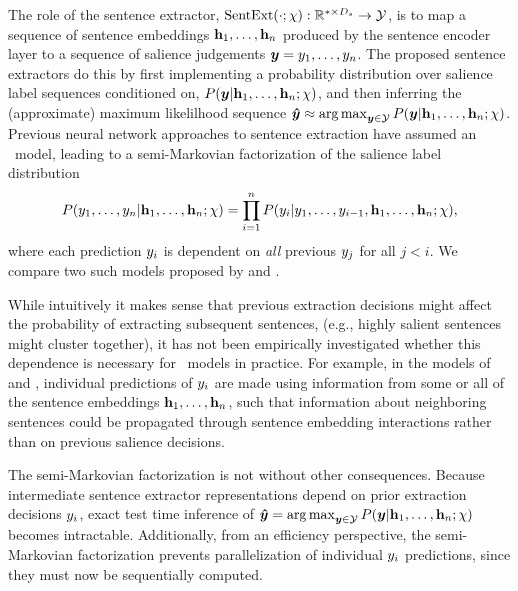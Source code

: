 The role of the sentence extractor, 
$\operatorname{SentExt}(\cdot; \chi) : \mathbb{R}^{* \times D_{s}} \rightarrow \mathcal{Y}$, is to map a
sequence of sentence 
embeddings 
    $\mathbf{h}_1,\ldots,\mathbf{h}_n$ %
produced by the sentence encoder layer to a sequence of salience judgements 
    $\boldsymbol{y} = y_1,\ldots, y_n$. %
    The proposed sentence extractors do this by first implementing a 
    probability distribution over salience label sequences conditioned 
    on, $P(\boldsymbol{y}|\mathbf{h}_1,\ldots,\mathbf{h}_n; \chi)$, and then inferring the (approximate) maximum likelilhood
    sequence $\boldsymbol{\hat{y}} \approx \operatorname*{arg\,max}_{\boldsymbol{y} \in \mathcal{Y}} P(\boldsymbol{y}|\mathbf{h}_1,\ldots,\mathbf{h}_n;\chi)$.
Previous neural network approaches to sentence extraction have assumed 
an \autoregressive~model, leading to a semi-Markovian factorization of the 
salience label distribution
  \[P(y_{1},\ldots,y_n|\mathbf{h}_1,\ldots,\mathbf{h}_n;\chi)=
      \prod_{i=1}^n 
        P(y_i|y_1,\ldots,y_{i-1},\mathbf{h}_1,\ldots,\mathbf{h}_n;\chi),\]
where each prediction $y_i$ is dependent on 
\emph{all} 
previous $y_j$ for
all $j < i$. We compare two such models proposed by \citet{cheng2016neural}
and \citet{nallapati2017summarunner}. 

While intuitively it makes sense that previous extraction decisions might 
affect the probability of extracting subsequent sentences, (e.g., highly 
salient sentences might cluster together), it has not been empirically 
investigated whether this dependence is necessary for \deeplearning~models in 
practice. For example, in the models of 
\citet{cheng2016neural} and \citet{nallapati2017summarunner}, individual
predictions of $y_i$ are made using information from some or all of 
the sentence embeddings $\mathbf{h}_1, \ldots, \mathbf{h}_n$, such that 
information about neighboring sentences could be propagated through sentence
embedding interactions rather than on previous salience decisions.

The semi-Markovian factorization is not without
other consequences. Because intermediate sentence extractor representations
depend on prior extraction decisions $y_i$, exact test time inference of
$\boldsymbol{\hat{y}} = \operatorname*{arg\,max}_{\boldsymbol{y} \in \mathcal{Y}} 
P(\boldsymbol{y}|\mathbf{h}_1,\ldots,\mathbf{h}_n;\chi)$
becomes intractable. Additionally, from an efficiency perspective, 
the semi-Markovian factorization prevents parallelization of individual
$y_i$ predictions, since they must now be sequentially computed.

